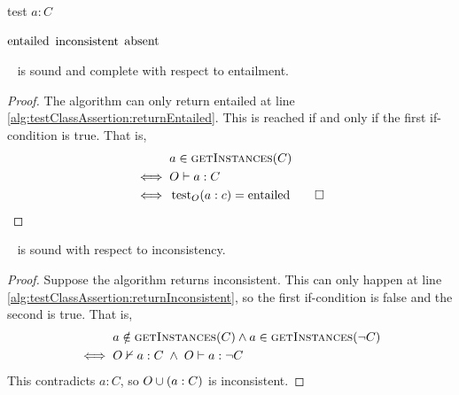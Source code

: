 \documentclass[paper.tex]{subfiles}
\begin{document}
\begin{algorithm}[H]
  \caption{test $a : C$}
  \label{alg:testClassAssertion}
  \begin{algorithmic}[1]
    \raggedright
        \label{alg:testClassAssertion:checkEntailed}
        \State \Return $\mathrm{entailed}$
        \label{alg:testClassAssertion:returnEntailed}
        \label{alg:testClassAssertion:checkInconsistent}
        \State \Return $\mathrm{inconsistent}$
        \label{alg:testClassAssertion:returnInconsistent}
      \Else
        \State \Return $\mathrm{absent}$
      \EndIf
    \EndFunction
  \end{algorithmic}
\end{algorithm}

\begin{proposition}
  \label{prop:testClassAssertionEntailed}
  \sloppy~
   is sound and complete with respect to entailment.
\end{proposition}
\begin{proof}
  The algorithm can only return entailed at line \ref{alg:testClassAssertion:returnEntailed}.  This is reached if and only if the first if-condition is true.  That is,
  \begin{align*}
    & a \in \Call{getInstances}{C} \\
    \iff{}& O \sementails a : C \\
    \iff{}& \test_O(a : c) = \entailed \qed
  \end{align*}
\end{proof}

\begin{proposition}
  \sloppy~
   is sound with respect to inconsistency.
\end{proposition}
\begin{proof}
  Suppose the algorithm returns inconsistent.  This can only happen at line \ref{alg:testClassAssertion:returnInconsistent}, so the first if-condition is false and the second is true.  That is,
  \begin{align*}
    & a \notin \Call{getInstances}{C} \land a \in \Call{getInstances}{\neg C} \\
    \iff{}& O \nsementails a : C \;\land\; O \sementails a : \neg C
  \end{align*}
  This contradicts $a : C$, so $O \cup (a : C)$ is inconsistent.
\end{proof}
\end{document}
